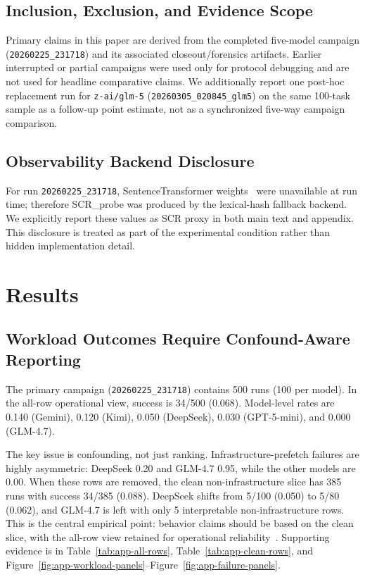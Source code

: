 \documentclass[11pt]{article}
\begin{document}
\subsection{Inclusion, Exclusion, and Evidence Scope}
Primary claims in this paper are derived from the completed five-model campaign (\texttt{20260225\_231718}) and its associated closeout/forensics artifacts. Earlier interrupted or partial campaigns were used only for protocol debugging and are not used for headline comparative claims. We additionally report one post-hoc replacement run for \texttt{z-ai/glm-5} (\texttt{20260305\_020845\_glm5}) on the same 100-task sample as a follow-up point estimate, not as a synchronized five-way campaign comparison.

\subsection{Observability Backend Disclosure}
For run \texttt{20260225\_231718}, SentenceTransformer weights~\cite{reimers2019sentencebert} were unavailable at run time; therefore SCR\_probe was produced by the lexical-hash fallback backend. We explicitly report these values as SCR proxy in both main text and appendix. This disclosure is treated as part of the experimental condition rather than hidden implementation detail.

\section{Results}

\subsection{Workload Outcomes Require Confound-Aware Reporting}
The primary campaign (\texttt{20260225\_231718}) contains 500 runs (100 per model). In the all-row operational view, success is 34/500 (0.068). Model-level rates are 0.140 (Gemini), 0.120 (Kimi), 0.050 (DeepSeek), 0.030 (GPT-5-mini), and 0.000 (GLM-4.7).

The key issue is confounding, not just ranking. Infrastructure-prefetch failures are highly asymmetric: DeepSeek 0.20 and GLM-4.7 0.95, while the other models are 0.00. When these rows are removed, the clean non-infrastructure slice has 385 runs with success 34/385 (0.088). DeepSeek shifts from 5/100 (0.050) to 5/80 (0.062), and GLM-4.7 is left with only 5 interpretable non-infrastructure rows. This is the central empirical point: behavior claims should be based on the clean slice, with the all-row view retained for operational reliability~\cite{Wang2025SavingSWE,Wang2025DissectingSWE}. Supporting evidence is in Table~\ref{tab:app-all-rows}, Table~\ref{tab:app-clean-rows}, and Figure~\ref{fig:app-workload-panels}--Figure~\ref{fig:app-failure-panels}.
\end{document}
